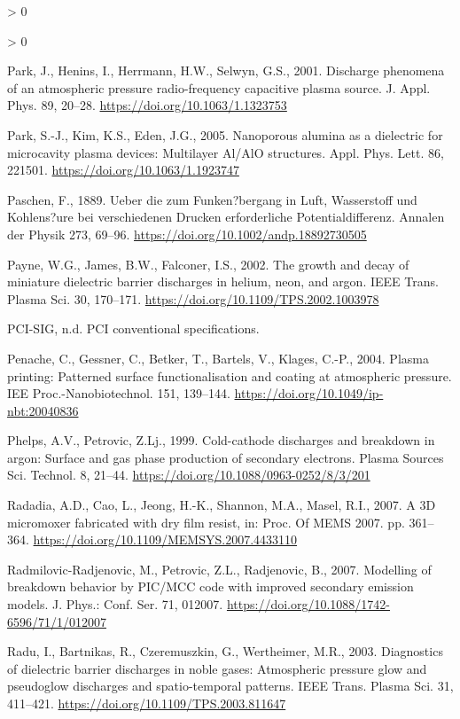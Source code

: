 \documentclass[
  11pt,
  twoside]{article}
\newlength{\cslhangindent}
\newenvironment{CSLReferences}[2] %
 {%
  \setlength{\parindent}{0pt}
  \ifodd #1 \everypar{\setlength{\hangindent}{\cslhangindent}}\ignorespaces\fi
  \ifnum #2 > 0
  \setlength{\parskip}{#2\baselineskip}
  \fi
 }%
 {}
\begin{document}
\begin{CSLReferences}{1}{0}
\begin{CSLReferences}{1}{0}
\leavevmode\hypertarget{ref-Park01}{}%
Park, J., Henins, I., Herrmann, H.W., Selwyn, G.S., 2001. Discharge phenomena of an atmospheric pressure radio-frequency capacitive plasma source. J. Appl. Phys. 89, 20--28. \url{https://doi.org/10.1063/1.1323753}

\leavevmode\hypertarget{ref-Park05}{}%
Park, S.-J., Kim, K.S., Eden, J.G., 2005. Nanoporous alumina as a dielectric for microcavity plasma devices: Multilayer {Al/AlO} structures. Appl. Phys. Lett. 86, 221501. \url{https://doi.org/10.1063/1.1923747}

\leavevmode\hypertarget{ref-Pasc1889}{}%
Paschen, F., 1889. {Ueber die zum Funken?bergang in Luft, Wasserstoff und Kohlens?ure bei verschiedenen Drucken erforderliche Potentialdifferenz}. Annalen der Physik 273, 69--96. \url{https://doi.org/10.1002/andp.18892730505}

\leavevmode\hypertarget{ref-Payn02}{}%
Payne, W.G., James, B.W., Falconer, I.S., 2002. The growth and decay of miniature dielectric barrier discharges in helium, neon, and argon. IEEE Trans. Plasma Sci. 30, 170--171. \url{https://doi.org/10.1109/TPS.2002.1003978}

\leavevmode\hypertarget{ref-PCI}{}%
PCI-SIG, n.d. {PCI} conventional specifications.

\leavevmode\hypertarget{ref-Pena04}{}%
Penache, C., Gessner, C., Betker, T., Bartels, V., Klages, C.-P., 2004. Plasma printing: Patterned surface functionalisation and coating at atmospheric pressure. IEE Proc.-Nanobiotechnol. 151, 139--144. \url{https://doi.org/10.1049/ip-nbt:20040836}

\leavevmode\hypertarget{ref-Phel1999}{}%
Phelps, A.V., Petrovic, Z.Lj., 1999. Cold-cathode discharges and breakdown in argon: Surface and gas phase production of secondary electrons. Plasma Sources Sci. Technol. 8, 21--44. \url{https://doi.org/10.1088/0963-0252/8/3/201}

\leavevmode\hypertarget{ref-Rada07}{}%
Radadia, A.D., Cao, L., Jeong, H.-K., Shannon, M.A., Masel, R.I., 2007. A {3D} micromoxer fabricated with dry film resist, in: Proc. Of MEMS 2007. pp. 361--364. \url{https://doi.org/10.1109/MEMSYS.2007.4433110}

\leavevmode\hypertarget{ref-Radm07}{}%
Radmilovic-Radjenovic, M., Petrovic, Z.L., Radjenovic, B., 2007. Modelling of breakdown behavior by {PIC/MCC} code with improved secondary emission models. J. Phys.: Conf. Ser. 71, 012007. \url{https://doi.org/10.1088/1742-6596/71/1/012007}

\leavevmode\hypertarget{ref-Radu03}{}%
Radu, I., Bartnikas, R., Czeremuszkin, G., Wertheimer, M.R., 2003. Diagnostics of dielectric barrier discharges in noble gases: Atmospheric pressure glow and pseudoglow discharges and spatio-temporal patterns. IEEE Trans. Plasma Sci. 31, 411--421. \url{https://doi.org/10.1109/TPS.2003.811647}


\end{CSLReferences}
\end{CSLReferences}
\end{document}
